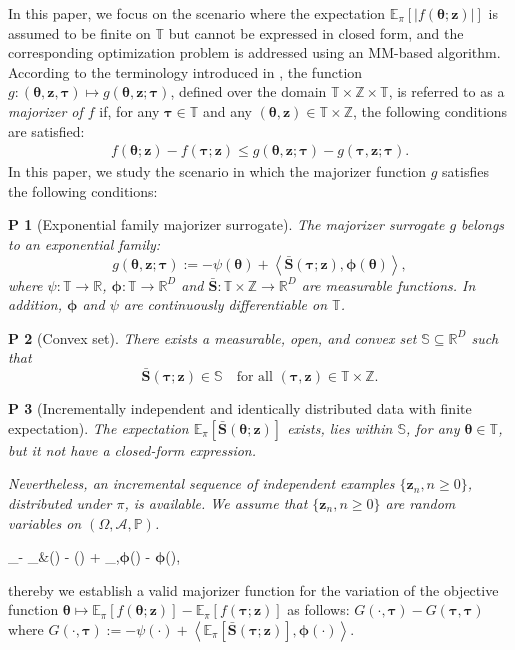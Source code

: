 \documentclass{article}
\def\phib        {{\sbmm{\phi}}\XS}        \def\Phib       {{\sbmm{\Phi}}\XS}
\def\XS{\xspace}
\def\sbmm#1{\ensuremath{\boldsymbol{#1}}}
\newtheorem{assumptionP}{P}
\def\eqdef{:=}
\def\rset{\mathbb{R}}
\def\PE{\mathbb{E}_\pi} %
\newcommand{\pscal}[2]{\left\langle#1,#2\right\rangle} %
\def\bars{\bar{\vS}}
\def\rvz{{\mathbf{z}}}
\def\vtau{{\bm{\tau}}}
\def\vtheta{{\bm{\theta}}}
\def\vS{{\bm{S}}}
\def\vz{{\bm{z}}}
\def\sS{{\mathbb{S}}}
\def\sT{{\mathbb{T}}}
\def\sZ{{\mathbb{Z}}}
\begin{document}
In this paper, we focus on the scenario where the expectation $\PE\left[|f\left(\vtheta; \rvz \right)|\right]$ is assumed to be finite on $\mathbb{T}$ but cannot be expressed in closed form, and the corresponding optimization problem is addressed using an MM-based algorithm.  According to the terminology introduced in \cite{lange2016mm}, the function $g:\left(\vtheta, \vz, \vtau\right) \mapsto g\left(\vtheta, \vz; \vtau\right)$, defined over the domain $\sT \times \sZ \times \sT$, is referred to as a {\em majorizer of $f$} if, for any $\vtau \in \sT$ and any $(\vtheta, \vz) \in \sT \times \sZ$, the following conditions are satisfied:
\begin{align}\label{eq_minorizer_fct}
f(\vtheta;\vz) - f(\vtau;\vz) \leq g(\vtheta,\vz; \vtau) - g(\vtau, \vz; \vtau). 
\end{align}
In this paper, we study the scenario in which the majorizer function $g$ satisfies the following conditions:
\begin{assumptionP}[Exponential family majorizer surrogate]\label{assumptionA1} The majorizer surrogate $g$ belongs to an exponential family:
\begin{equation} \label{eq_exponential_family}
g\left(\vtheta,\vz;\vtau\right)\eqdef - \psi\left(\vtheta\right)+ \pscal{\bars(\vtau;\vz)}{\phib(\vtheta)},
\end{equation}
where $\psi:\sT \to \rset$, $\phib: \sT \to \rset^D$ and $\bars: \sT \times \sZ \to \rset^D$ are measurable functions. In addition, $\phib$ and $\psi$ are continuously differentiable on $\sT$.
\end{assumptionP}
\begin{assumptionP}[Convex set]\label{assumptionA2} There exists a measurable, open, and convex set $\sS \subseteq \rset^D$ such that
\[
  \bars(\vtau; \vz) \in \sS \quad \text{for all } (\vtau, \vz) \in \sT \times \sZ.
\] 
\end{assumptionP}
\begin{assumptionP}[Incrementally independent and identically distributed data with finite expectation]\label{assumptionA3}
The expectation $\PE[\bars(\vtheta; \rvz)]$ exists, lies within $\sS$, for any $\vtheta \in \sT$, but it not have a closed-form expression. 

Nevertheless, an incremental sequence of independent examples $\{\rvz_n, n \geq 0\}$, distributed under $\pi$, is available. We assume that $\{\rvz_n, n \geq 0\}$ are random variables on $(\Omega, \mathcal{A}, \mathbb P)$.
\end{assumptionP}
    \begin{inequality} \label{eq: min inq}
        \PE\left[f(\vtheta; \rvz)\right] - \PE\left[f(\vtau; \rvz)\right]   
        &\le \psi(\vtau) - \psi(\vtheta) + \pscal{\PE\left[\bars(\vtau; \rvz)\right]}{\phib(\vtheta) - \phib(\vtau)},  
    \end{inequality}  
    thereby we establish a valid majorizer function for the variation of the objective function $\vtheta \mapsto \PE\left[f(\vtheta; \rvz)\right] - \PE\left[f(\vtau; \rvz)\right]$ as follows:
    $G(\cdot, \vtau) - G(\vtau, \vtau)$ where $G(\cdot, \vtau) :=  -\psi(\cdot) + \pscal{\PE\left[\bars(\vtau; \rvz)\right]}{\phib(\cdot)}$.
\end{document}
